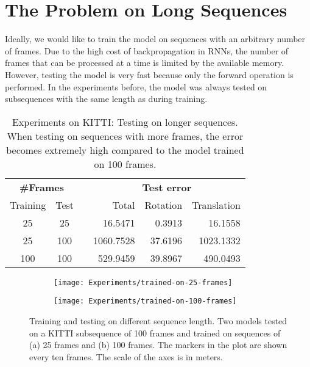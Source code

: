 	\section{The Problem on Long Sequences}
		Ideally, we would like to train the model on sequences with an arbitrary number of frames.
		Due to the high cost of backpropagation in RNNs, the number of frames that can be processed at a time is limited by the available memory.
		However, testing the model is very fast because only the forward operation is performed.
		In the experiments before, the model was always tested on subsequences with the same length as during training.
		
		\begin{table}[tb]
			\small
			\begin{center}
				\begin{tabular}{cccrrr}
					\toprule
					\multicolumn{2}{c}{\textbf{\#Frames}}	&	& \multicolumn{3}{c}{\textbf{Test error}} \\ 
					\cmidrule(lr){1-2} 									\cmidrule(lr){4-6}
					Training 		& Test 			&	& Total 	& Rotation	& Translation	\\ 
					\midrule
					25				& 25			&	& 16.5471	& 0.3913	& 16.1558		\\
					25				& 100			&	& 1060.7528	& 37.6196	& 1023.1332		\\
					100				& 100			&	& 529.9459	& 39.8967	& 490.0493		\\ 
					\bottomrule
				\end{tabular}
			\end{center}
			\caption[Experiments on KITTI: Testing on longer sequences]
					{Experiments on KITTI: Testing on longer sequences. 
					 When testing on sequences with more frames, the error becomes extremely high compared to the model trained on 100 frames.
				 \label{tbl:kitti-testing-on-longer-sequences}}
		\end{table}

		\begin{figure}
			\centering
			\begin{subfigure}[b]{0.5\linewidth}
				\centering
				\texttt{[image: Experiments/trained-on-25-frames]}
				\caption{
					\label{fig:0}
				}
			\end{subfigure}%
			\begin{subfigure}[b]{0.5\linewidth}
				\centering
				\texttt{[image: Experiments/trained-on-100-frames]}
				\caption{
					\label{fig:1}
				}
			\end{subfigure}%
			\caption[Training and testing on different sequence length]
					{Training and testing on different sequence length. 
				 Two models tested on a KITTI subsequence of 100 frames and trained on sequences of (a) 25 frames and (b) 100 frames. 
				 The markers in the plot are shown every ten frames.
				 The scale of the axes is in meters.
				 \label{fig:kitti-testing-on-longer-sequences}}
		\end{figure}


